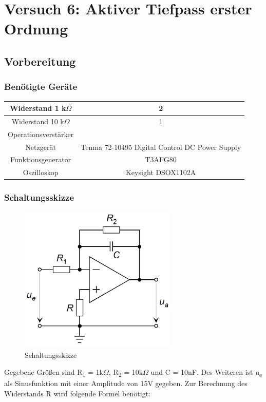 \chapter*{Versuch 6: Aktiver Tiefpass erster Ordnung}

\section*{Vorbereitung}

\subsection*{Benötigte Geräte}

\begin{tabular}[h]{c|c}
    Widerstand 1 k$\Omega$ & 2\\
    \hline
    Widerstand 10 k$\Omega$ & 1\\
    \hline
    Operationsverstärker & \\
    \hline
    Netzgerät & Tenma 72-10495 Digital Control DC Power Supply\\
    \hline
    Funktionsgenerator & T3AFG80\\
    \hline
    Oszilloskop & Keysight DSOX1102A
    \label{tab:Versuch 6: Geräte}
\end{tabular}
\subsection*{Schaltungsskizze}

\begin{figure}[H]
    \centering
    \includegraphics[height=7cm]{images/Versuch6/Schaltungsskizze.jpeg} 
    \caption{Schaltungsskizze}
    \label{fig: Schaltungsskizze}
\end{figure}
Gegebene Größen sind R\textsubscript{1} = 1k$\Omega$,
R\textsubscript{2} = 10k$\Omega$ und C = 10nF.
Des Weiteren ist u\textsubscript{e} als Sinusfunktion mit einer
Amplitude von 15V gegeben.
Zur Berechnung des Widerstands R wird folgende Formel benötigt:

